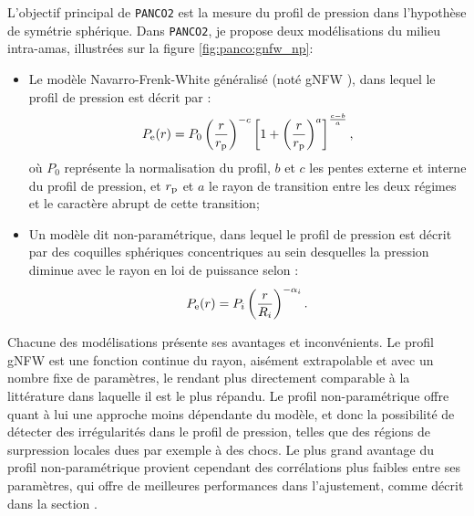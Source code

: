 L'objectif principal de \texttt{PANCO2} est la mesure du profil de pression dans l'hypothèse de symétrie sphérique.
Dans \texttt{PANCO2}, je propose deux modélisations du milieu intra-amas, illustrées sur la figure \ref{fig:panco:gnfw_np}:
\begin{itemize}[leftmargin=*]
    \setlength\itemsep{5pt}
    \item Le modèle Navarro-Frenk-White généralisé (noté \guillemotleft gNFW \guillemotright), dans lequel le profil de pression est décrit par \cite{zhao_analytical_1996,nagai_effects_2007} :
    \begin{equation}
        \label{eq:panco:gnfw}
        P_{\rm e}(r) = P_0
        \left(\frac{r}{r_{\rm p}}\right)^{-c}
        \left[1 + \left(\frac{r}{r_{\rm p}}\right)^a \right]^\frac{c-b}{a} ,
    \end{equation}
    où $P_0$ représente la normalisation du profil, $b$ et $c$ les pentes externe et interne du profil de pression, et $r_{\rm p}$ et $a$ le rayon de transition entre les deux régimes et le caractère abrupt de cette transition;

\item Un modèle dit \guillemotleft non-paramétrique\footnotemark\guillemotright, dans lequel le profil de pression est décrit par des coquilles sphériques concentriques au sein desquelles la pression diminue avec le rayon en loi de puissance selon \cite{ruppin_non-parametric_2017,romero_multi-instrument_2018}:
    \begin{equation}
        \label{eq:panco:nonparam}
        P_{\rm e}(r) = P_i \left(\frac{r}{R_i}\right)^{-\alpha_i} .
    \end{equation}
\end{itemize}

Chacune des modélisations présente ses avantages et inconvénients.
Le profil gNFW est une fonction continue du rayon, aisément extrapolable et avec un nombre fixe de paramètres, le rendant plus directement comparable à la littérature dans laquelle il est le plus répandu.
Le profil non-paramétrique offre quant à lui une approche moins dépendante du modèle, et donc la possibilité de détecter des irrégularités dans le profil de pression, telles que des régions de surpression locales dues par exemple à des chocs.
Le plus grand avantage du profil non-paramétrique provient cependant des corrélations plus faibles entre ses paramètres, qui offre de meilleures performances dans l'ajustement, comme décrit dans la section .

